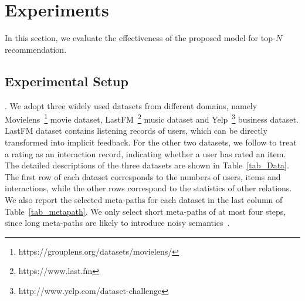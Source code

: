 \section{Experiments}
In this section, we evaluate the effectiveness of the proposed model for top-$N$ recommendation. %

\subsection{Experimental Setup}

. We adopt three widely used datasets from different domains, namely Movielens~\footnote{https://grouplens.org/datasets/movielens/} movie dataset, LastFM~\footnote{https://www.last.fm} music dataset and Yelp~\footnote{http://www.yelp.com/dataset-challenge}  business dataset.  LastFM dataset contains listening records of users, which can be directly transformed into implicit feedback. For the other two datasets, we follow \cite{he2017neural,tay2018latent} to treat a rating as an interaction record, indicating whether a user has rated an item.  The detailed descriptions of the three datasets are shown in Table~\ref{tab_Data}.
The first row of each dataset corresponds to the numbers of users, items and interactions, while the other rows correspond to the  statistics of other relations.  
We also report the selected meta-paths for each dataset in the last column of Table~\ref{tab_metapath}.
We only select short meta-paths of at most four steps, since long meta-paths are likely to introduce noisy semantics~\cite{sun2011pathsim}.


